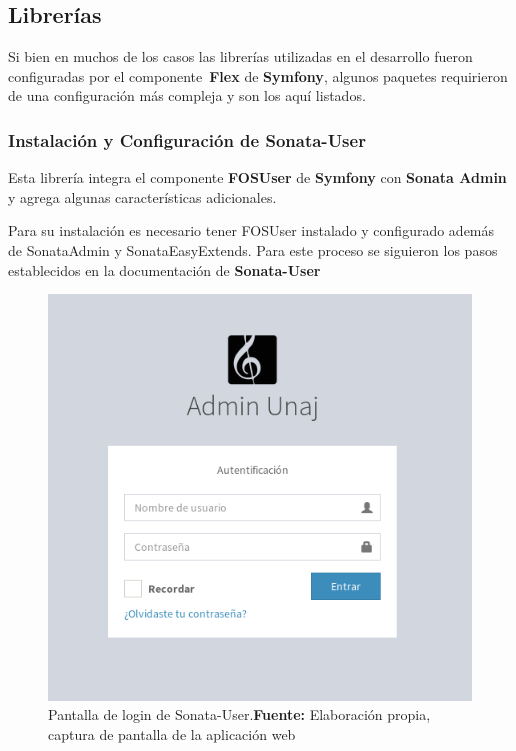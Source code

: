 
\subsection{Librerías}%
\label{sub:librerias}

Si bien en muchos de los casos las librerías utilizadas en el desarrollo fueron configuradas por el componente~\textbf{Flex}  de \textbf{Symfony}, algunos paquetes
requirieron de una configuración más compleja y son los aquí listados.

\subsubsection{Instalación y Configuración de Sonata-User}%
\label{ssub:instalacion_y_configuración_de_sonata-user}

Esta librería integra el componente \textbf{FOSUser} de \textbf{Symfony} con \textbf{Sonata Admin} y agrega algunas características adicionales.




Para su instalación es necesario tener FOSUser instalado y configurado además de SonataAdmin y SonataEasyExtends\@.
Para este proceso se siguieron los pasos establecidos en la documentación de \textbf{Sonata-User}~\parencite{sonata-user}

\begin{figure}[H]
    \includegraphics[width=1\linewidth]{image/adminLogin.png}
    \caption[Pantalla de login de Sonata-User]{Pantalla de login de Sonata-User.\newline \textbf{Fuente:} Elaboración propia, captura de pantalla de la aplicación web}
    \label{fig:image/adminLogin}
\end{figure}


